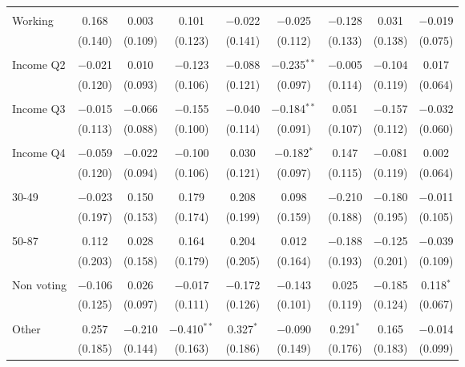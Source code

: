\begin{tabular}{@{\extracolsep{5pt}}lcccccccc}
  & & & & & & & & \\ 
 Working & 0.168 & 0.003 & 0.101 & $-$0.022 & $-$0.025 & $-$0.128 & 0.031 & $-$0.019 \\ 
  & (0.140) & (0.109) & (0.123) & (0.141) & (0.112) & (0.133) & (0.138) & (0.075) \\ 
  & & & & & & & & \\ 
 Income Q2 & $-$0.021 & 0.010 & $-$0.123 & $-$0.088 & $-$0.235$^{**}$ & $-$0.005 & $-$0.104 & 0.017 \\ 
  & (0.120) & (0.093) & (0.106) & (0.121) & (0.097) & (0.114) & (0.119) & (0.064) \\ 
  & & & & & & & & \\ 
 Income Q3 & $-$0.015 & $-$0.066 & $-$0.155 & $-$0.040 & $-$0.184$^{**}$ & 0.051 & $-$0.157 & $-$0.032 \\ 
  & (0.113) & (0.088) & (0.100) & (0.114) & (0.091) & (0.107) & (0.112) & (0.060) \\ 
  & & & & & & & & \\ 
 Income Q4 & $-$0.059 & $-$0.022 & $-$0.100 & 0.030 & $-$0.182$^{*}$ & 0.147 & $-$0.081 & 0.002 \\ 
  & (0.120) & (0.094) & (0.106) & (0.121) & (0.097) & (0.115) & (0.119) & (0.064) \\ 
  & & & & & & & & \\ 
 30-49 & $-$0.023 & 0.150 & 0.179 & 0.208 & 0.098 & $-$0.210 & $-$0.180 & $-$0.011 \\ 
  & (0.197) & (0.153) & (0.174) & (0.199) & (0.159) & (0.188) & (0.195) & (0.105) \\ 
  & & & & & & & & \\ 
 50-87 & 0.112 & 0.028 & 0.164 & 0.204 & 0.012 & $-$0.188 & $-$0.125 & $-$0.039 \\ 
  & (0.203) & (0.158) & (0.179) & (0.205) & (0.164) & (0.193) & (0.201) & (0.109) \\ 
  & & & & & & & & \\ 
 Non voting & $-$0.106 & 0.026 & $-$0.017 & $-$0.172 & $-$0.143 & 0.025 & $-$0.185 & 0.118$^{*}$ \\ 
  & (0.125) & (0.097) & (0.111) & (0.126) & (0.101) & (0.119) & (0.124) & (0.067) \\ 
  & & & & & & & & \\ 
 Other & 0.257 & $-$0.210 & $-$0.410$^{**}$ & 0.327$^{*}$ & $-$0.090 & 0.291$^{*}$ & 0.165 & $-$0.014 \\ 
  & (0.185) & (0.144) & (0.163) & (0.186) & (0.149) & (0.176) & (0.183) & (0.099) \\ 

\end{tabular}
